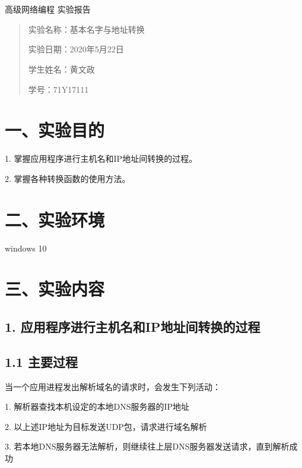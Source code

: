 \documentclass[UTF8]{ctexart}
\begin{document}
	\begin{center}
		\quad \\
		\quad \\
		\heiti \fontsize{45}{17} 高级网络编程
		\vskip 2.0cm
		\heiti \fontsize{39}{17} 实验报告	
	\end{center}
	\vskip 3.5cm
	\begin{quotation}
		\par\setlength\parindent{8.5em}
		\quad 
		\heiti 
		
		实验名称：基本名字与地址转换
		
		实验日期：2020年5月22日
	
		学生姓名：黄文政
		
		学\hspace{0.72cm}号：71Y17111
		
		\vskip 2cm
		\centering
	\end{quotation}
	
\newpage
\songti \fontsize{13}{13}
\large
\section*{一、实验目的}

1. 掌握应用程序进行主机名和IP地址间转换的过程。

2. 掌握各种转换函数的使用方法。


\section*{二、实验环境}
windows 10

\section*{三、实验内容}
\subsection*{\textbf{1. 应用程序进行主机名和IP地址间转换的过程}}
\subsection*{1.1 主要过程}

当一个应用进程发出解析域名的请求时，会发生下列活动：

1. 解析器查找本机设定的本地DNS服务器的IP地址

2. 以上述IP地址为目标发送UDP包，请求进行域名解析

3. 若本地DNS服务器无法解析，则继续往上层DNS服务器发送请求，直到解析成功
\end{document}
